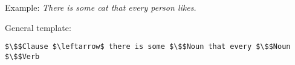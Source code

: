 \item {}
Example: {\em There is some cat that every person likes.}

General template: 
\begin{lstlisting}[mathescape]
$\$$Clause $\leftarrow$ there is some $\$$Noun that every $\$$Noun $\$$Verb
\end{lstlisting}
